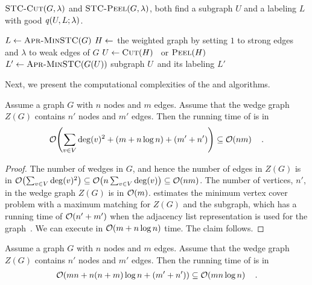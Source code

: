 \begin{algorithm}[t!]
\caption{$\textsc{STC-Cut}(G, \lambda)$ and $\textsc{STC-Peel}(G, \lambda)$, both find a subgraph $U$ and a labeling $L$ with good $\score{U, L; \lambda}$.}
\label{alg:dense}
    $L \leftarrow \textsc{Apr-MinSTC}(G)$\;
    $H \leftarrow$ the weighted graph by setting $1$ to strong edges and $\lambda$ to  weak edges of $G$\;
    $U \leftarrow  \textsc{Cut}(H)$~\cite{goldberg1984finding}  or $\textsc{Peel}(H)$~\cite{ charikar2000greedy}\label{alg:dense-subgraph}\;
    $L' \leftarrow \textsc{Apr-MinSTC}(G(U))$\;
    \Return subgraph $U$\ and its labeling $L'$\;
\end{algorithm}

Next, we present the computational complexities of the \algdensec and \algdenseg algorithms.

\begin{proposition}
Assume a graph $G$ with $n$ nodes and $m$ edges. Assume that the wedge graph $Z(G)$ contains $n'$ nodes and $m'$ edges.
Then the running time of \algdensec is in
\begin{align*}
	\bigO{\sum_{v \in V} \deg(v)^2 + (m + n \log n) + (m' + n')}  \subseteq \bigO{nm} \quad.
\end{align*}
\label{prop:dense}
\end{proposition}

\begin{proof}
The number of wedges in $G$, and hence the number of edges in $Z(G)$ is in $\bigO{\sum_{v \in V} \deg(v)^2} \subseteq \bigO{n\sum_{v \in V} \deg(v)}  \subseteq \bigO{nm}$. 
The number of vertices, $n'$, in the wedge graph $Z(G)$ is in $\bigO{m}$.
\algminstc estimates the minimum vertex cover problem with a maximum matching for $Z(G)$ and the subgraph, which has a running time of $\bigO{n' + m'}$ when the adjacency list representation is used for the graph~\cite{cormen2022introduction}. We can execute
\algdc in $\bigO{m + n \log n}$ time. The claim follows.
\end{proof}

\begin{proposition}
Assume a graph $G$ with $n$ nodes and  $m$ edges. Assume that the wedge graph $Z(G)$ contains $n'$ nodes and $m'$ edges.
Then the running time of \algdenseg  is in
\begin{align*}
\bigO{mn + n (n + m) \log n + (m' + n')} \subseteq \bigO{ mn \log n} \quad.
\end{align*} 

\label{prop:dense-goldberg}
\end{proposition}

